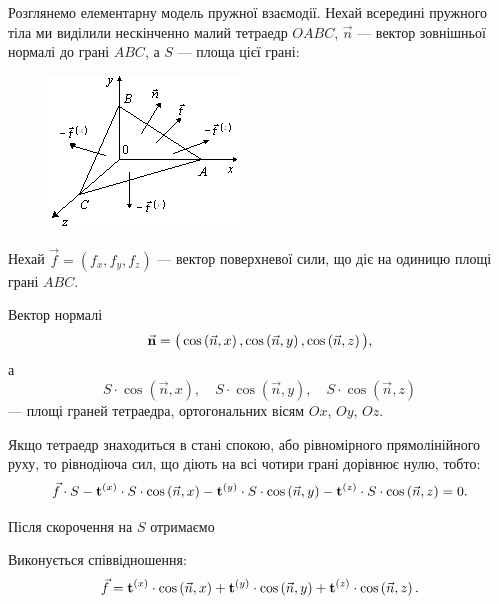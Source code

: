 Розглянемо елементарну модель пружної взаємодії. Нехай всередині пружного тіла ми виділили нескінченно малий тетраедр $OABC$, $\vec n$ --- вектор зовнішньої нормалі до грані $ABC$, а $S$ --- площа цієї грані:
\begin{figure}[H]
	\centering
	\includegraphics[]{img/8-2.png}
\end{figure}

Нехай $\vec f = (f_x, f_y, f_z)$ --- вектор поверхневої сили, що діє на одиницю площі грані $ABC$. \medskip

Вектор нормалі
\begin{equation}
	\vec{\bf{n}} = \big( \cos\left( \vec n, x \right), \cos \left( \vec n, y \right), \cos \left( \vec n, z \right) \big),
\end{equation}
а
\begin{equation}
	S \cdot \cos \left(\vec n, x \right), \quad S \cdot \cos \left(\vec n, y \right), \quad S \cdot \cos \left(\vec n, z \right) 	
\end{equation} 
--- площі граней тетраедра, ортогональних вісям $Ox$, $Oy$, $Oz$. \medskip

Якщо тетраедр знаходиться в стані спокою, або рівномірного прямолінійного руху, то рівнодіюча сил, що діють на всі чотири грані дорівнює нулю, тобто: 
\begin{equation}
	\vec f \cdot S - \bf{t}^{(x)} \cdot S \cdot \cos \left( \vec n, x\right) - \bf{t}^{(y)} \cdot S \cdot \cos \left( \vec n, y\right) - \bf{t}^{(z)} \cdot S \cdot \cos \left( \vec n, z\right) = 0.
\end{equation}

Після скорочення на $S$ отримаємо
\begin{theorem}
	Виконується співвідношення:
	\begin{equation}
		\vec f = \bf{t}^{(x)} \cdot \cos \left( \vec n, x\right) + \bf{t}^{(y)} \cdot \cos \left( \vec n, y\right) + \bf{t}^{(z)} \cdot \cos \left( \vec n, z\right).
	\end{equation}
\end{theorem}

